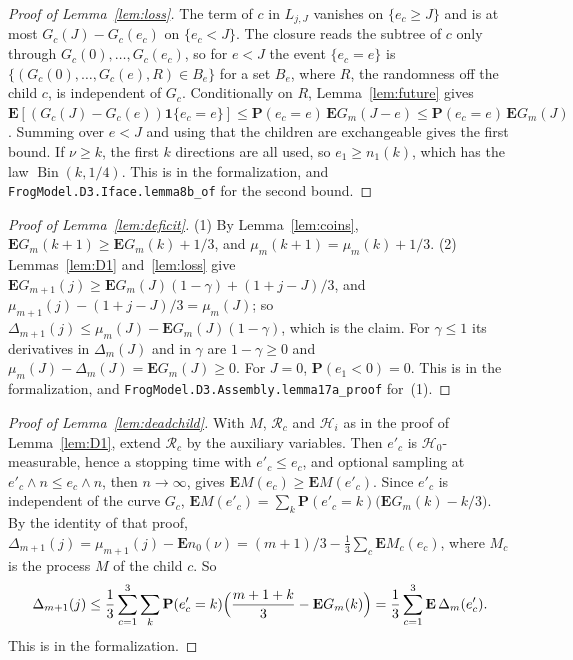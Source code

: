 \documentclass[11pt]{amsart}
\theoremstyle{definition}
\numberwithin{equation}{section}
\newcommand{\E}{\mathbf{E}}
\renewcommand{\P}{\mathbf{P}}
\newcommand{\one}{\mathbf{1}}
\newcommand{\Bin}{\operatorname{Bin}}
\begin{document}
\begin{proof}[Proof of Lemma~\ref{lem:loss}]
The term of $c$ in $L_{j,J}$ vanishes on $\{e_c\ge J\}$ and is at most $G_c(J)-G_c(e_c)$ on $\{e_c<J\}$. The closure reads the subtree of $c$ only through $G_c(0),\dots,G_c(e_c)$, so for $e<J$ the event $\{e_c=e\}$ is $\{(G_c(0),\dots,G_c(e),R)\in B_e\}$ for a set $B_e$, where $R$, the randomness off the child $c$, is independent of $G_c$. Conditionally on $R$, Lemma~\ref{lem:future} gives $\E[(G_c(J)-G_c(e))\one\{e_c=e\}]\le\P(e_c=e)\,\E G_m(J-e)\le\P(e_c=e)\,\E G_m(J)$. Summing over $e<J$ and using that the children are exchangeable gives the first bound. If $\nu\ge k$, the first $k$ directions are all used, so $e_1\ge n_1(k)$, which has the law $\Bin(k,1/4)$. This is  in the formalization, and \texttt{FrogModel.D3.Iface.lemma8b\_of} for the second bound.
\end{proof}

\begin{proof}[Proof of Lemma~\ref{lem:deficit}]
(1) By Lemma~\ref{lem:coins}, $\E G_m(k+1)\ge\E G_m(k)+1/3$, and $\mu_m(k+1)=\mu_m(k)+1/3$. (2) Lemmas~\ref{lem:D1} and~\ref{lem:loss} give $\E G_{m+1}(j)\ge\E G_m(J)(1-\gamma)+(1+j-J)/3$, and $\mu_{m+1}(j)-(1+j-J)/3=\mu_m(J)$; so $\Delta_{m+1}(j)\le\mu_m(J)-\E G_m(J)(1-\gamma)$, which is the claim. For $\gamma\le1$ its derivatives in $\Delta_m(J)$ and in $\gamma$ are $1-\gamma\ge0$ and $\mu_m(J)-\Delta_m(J)=\E G_m(J)\ge0$. For $J=0$, $\P(e_1<0)=0$. This is  in the formalization, and \texttt{FrogModel.D3.Assembly.lemma17a\_proof} for~(1).
\end{proof}

\begin{proof}[Proof of Lemma~\ref{lem:deadchild}]
With $M$, $\mathcal R_c$ and $\mathcal H_i$ as in the proof of Lemma~\ref{lem:D1}, extend $\mathcal R_c$ by the auxiliary variables. Then $e'_c$ is $\mathcal H_0$-measurable, hence a stopping time with $e'_c\le e_c$, and optional sampling at $e'_c\wedge n\le e_c\wedge n$, then $n\to\infty$, gives $\E M(e_c)\ge\E M(e'_c)$. Since $e'_c$ is independent of the curve $G_c$, $\E M(e'_c)=\sum_k\P(e'_c=k)\bigl(\E G_m(k)-k/3\bigr)$. By the identity of that proof, $\Delta_{m+1}(j)=\mu_{m+1}(j)-\E n_0(\nu)=(m+1)/3-\frac13\sum_c\E M_c(e_c)$, where $M_c$ is the process $M$ of the child $c$. So
\[
\Delta_{m+1}(j)\le\frac13\sum_{c=1}^3\sum_k\P(e'_c=k)\Bigl(\frac{m+1+k}3-\E G_m(k)\Bigr)=\frac13\sum_{c=1}^3\E\,\Delta_m(e'_c).
\]
This is  in the formalization.
\end{proof}
\end{document}
